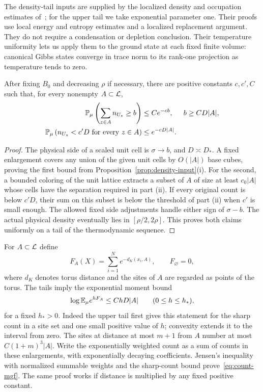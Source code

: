 The density-tail inputs are supplied by the localized density and occupation
estimates of~\cite[Lemmas~4.2 and~4.3]{C}; for the upper tail we take
exponential parameter one.
Their proofs use local energy and entropy estimates and a localized
replacement argument. They do not require a condensation or depletion
conclusion. Their temperature uniformity lets us apply them to the
ground state at each fixed finite volume: canonical Gibbs states converge
in trace norm to its rank-one projection as temperature tends to zero.

\begin{lemma}\label{lem:count-tails}
After fixing $B_0$ and decreasing $\rho$ if necessary, there are positive
constants $c,c',C$ such that, for every nonempty $A\subset\mathcal L$,
\begin{equation}\label{eq:count-tails}
 \begin{aligned}
 \mathbb P_\mu\left(\sum_{z\in A}n_{U_z}\ge b\right)
   &\le C e^{-cb},&& b\ge CD|A|,\\
 \mathbb P_\mu\left(n_{U_z}<c'D\text{ for every }z\in A\right)
   &\le e^{-cD|A|}.
 \end{aligned}
\end{equation}
\end{lemma}
\begin{proof}
The physical side of a scaled unit cell is $\sigma\to b$, and
$D\asymp D_*$. A fixed enlargement covers any union of the given unit
cells by $O(|A|)$ base cubes, proving the first bound from
Proposition~\ref{prop:density-input}(i). For the second, a bounded coloring
of the unit lattice extracts a subset of $A$ of size at least $c_0|A|$
whose cells have the separation required in part (ii). If every original
count is below $c'D$, their sum on this subset is below the threshold of
part (ii) when $c'$ is small enough. The allowed fixed side adjustments
handle either sign of $\sigma-b$. The actual physical density eventually
lies in $[\rho/2,2\rho]$. This proves both claims uniformly on a tail
of the thermodynamic sequence.
\end{proof}

For $A\subset\mathcal L$ define
\[
 F_A(X)=\sum_{i=1}^N e^{-d_K(x_i,A)},\qquad F_\varnothing=0,
\]
where $d_K$ denotes torus distance and the sites of $A$ are regarded as
points of the torus. The tails imply the exponential moment bound
\begin{equation}\label{eq:count-mgf}
 \log\mathbb E_\mu e^{hF_A}\le ChD|A|\qquad(0\le h\le h_*),
\end{equation}
for a fixed $h_*>0$. Indeed the upper tail first gives this statement
for the sharp count in a site set and one small positive value of $h$;
convexity extends it to the interval from zero. The sites at distance at
most $m+1$ from $A$ number at most $C(1+m)^3|A|$. Write the exponentially
weighted count as a sum of counts in these enlargements, with exponentially
decaying coefficients. Jensen's inequality with normalized summable weights
and the sharp-count bound prove~\eqref{eq:count-mgf}. The same proof works
if distance is multiplied by any fixed positive constant.

